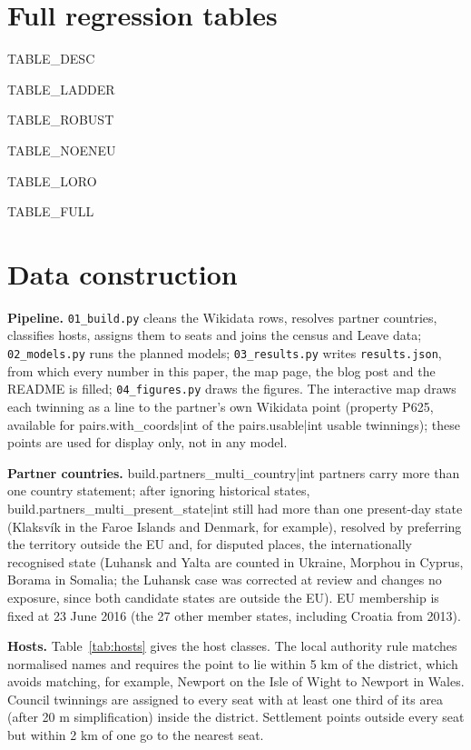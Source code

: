 \documentclass[11pt,a4paper]{article}
\begin{document}



\clearpage
\appendix
\section{Full regression tables}\label{app:tables}
{{TABLE_DESC}}

{{TABLE_LADDER}}

{{TABLE_ROBUST}}

{{TABLE_NOENEU}}

{{TABLE_LORO}}

{{TABLE_FULL}}

\section{Data construction}\label{app:data}
\textbf{Pipeline.} \texttt{01\_build.py} cleans the Wikidata rows, resolves partner countries, classifies hosts, assigns them to seats and joins the census and Leave data; \texttt{02\_models.py} runs the planned models; \texttt{03\_results.py} writes \texttt{results.json}, from which every number in this paper, the map page, the blog post and the README is filled; \texttt{04\_figures.py} draws the figures. The interactive map draws each twinning as a line to the partner's own Wikidata point (property P625, available for {{pairs.with_coords|int}} of the {{pairs.usable|int}} usable twinnings); these points are used for display only, not in any model.

\textbf{Partner countries.} {{build.partners_multi_country|int}} partners carry more than one country statement; after ignoring historical states, {{build.partners_multi_present_state|int}} still had more than one present-day state (Klaksv\'ik in the Faroe Islands and Denmark, for example), resolved by preferring the territory outside the EU and, for disputed places, the internationally recognised state (Luhansk and Yalta are counted in Ukraine, Morphou in Cyprus, Borama in Somalia; the Luhansk case was corrected at review and changes no exposure, since both candidate states are outside the EU). EU membership is fixed at 23 June 2016 (the 27 other member states, including Croatia from 2013).

\textbf{Hosts.} Table~\ref{tab:hosts} gives the host classes. The local authority rule matches normalised names and requires the point to lie within 5 km of the district, which avoids matching, for example, Newport on the Isle of Wight to Newport in Wales. Council twinnings are assigned to every seat with at least one third of its area (after 20 m simplification) inside the district. Settlement points outside every seat but within 2 km of one go to the nearest seat.
\end{document}
